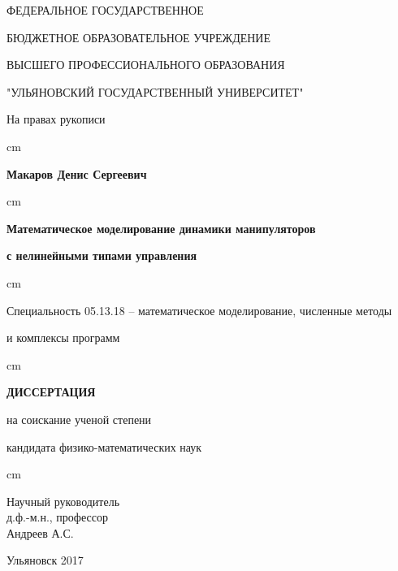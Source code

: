 \thispagestyle{empty}
\centerline{ФЕДЕРАЛЬНОЕ ГОСУДАРСТВЕННОЕ }
\centerline{БЮДЖЕТНОЕ ОБРАЗОВАТЕЛЬНОЕ УЧРЕЖДЕНИЕ}
\centerline{ВЫСШЕГО ПРОФЕССИОНАЛЬНОГО ОБРАЗОВАНИЯ}
\centerline{ "УЛЬЯНОВСКИЙ  ГОСУДАРСТВЕННЫЙ УНИВЕРСИТЕТ" }

\vglue 2cm
\par
\begin{flushright}
На правах рукописи
\end{flushright}


 cm \centerline{\bf Макаров Денис Сергеевич}

 cm \centerline{\bf Математическое моделирование динамики манипуляторов}
\centerline{\bf с нелинейными типами управления}


 cm \centerline{Специальность 05.13.18 -- математическое моделирование, численные методы}
\centerline{ и комплексы программ}
 cm \centerline{\bf ДИССЕРТАЦИЯ}
\vglue 0.5cm \centerline{ на соискание ученой степени}
\centerline{ кандидата физико-математических наук}  cm

\begin{flushright}
Научный руководитель  \\ 
д.ф.-м.н., профессор\\ 
Андреев А.С.\\
\end{flushright}

\vglue 1.5cm \centerline{Ульяновск  2017}


